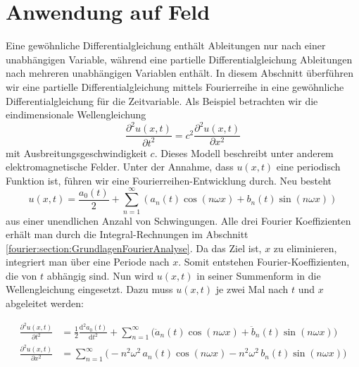 %
%
%
%



\section{Anwendung auf Feld\label{fourier:section:AnwendungAufFeld}}

Eine gewöhnliche Differentialgleichung enthält Ableitungen nur nach einer unabhängigen Variable, während eine partielle Differentialgleichung Ableitungen nach mehreren unabhängigen Variablen enthält.  
In diesem Abschnitt überführen wir eine partielle Differentialgleichung mittels Fourierreihe in eine gewöhnliche Differentialgleichung für die Zeitvariable.
Als Beispiel betrachten wir die eindimensionale Wellengleichung  
\begin{equation}\label{eq:wellengleichung}
	\frac{\partial^2 u(x,t)}{\partial t^2} = c^2 \frac{\partial^2 u(x,t)}{\partial x^2}
\end{equation}  
mit Ausbreitungsgeschwindigkeit $c$. Dieses Modell beschreibt unter anderem elektromagnetische Felder.  
Unter der Annahme, dass $u(x, t)$ eine periodisch Funktion ist, führen wir eine Fourierreihen-Entwicklung durch. 
Neu besteht 
\begin{equation}
	u(x,t) = \frac{a_0(t)}{2} + \sum_{n=1}^{\infty} \left( a_n(t) \cos(n \omega x) + b_n(t) \sin(n \omega x) \right)
\end{equation}
aus einer unendlichen Anzahl von Schwingungen.
Alle drei Fourier Koeffizienten erhält man durch die Integral-Rechnungen im Abschnitt \ref{fourier:section:GrundlagenFourierAnalyse}. 
Da das Ziel ist, $x$ zu eliminieren, integriert man über eine Periode nach $x$.
Somit entstehen Fourier-Koeffizienten, die von $t$ abhängig sind. 
Nun wird $u(x,t)$ in seiner Summenform in die Wellengleichung eingesetzt. 
Dazu muss $u(x,t)$ je zwei Mal nach $t$ und $x$ abgeleitet werden:

\begin{equation}
	\begin{aligned}
		\frac{\partial^2 u(x,t)}{\partial t^2}
		&= \frac{1}{2}\frac{\mathrm d^2 a_0(t)}{\mathrm d t^2}
		+ \sum_{n=1}^{\infty}\bigl(\ddot a_n(t)\cos(n\omega x)+\ddot b_n(t)\sin(n\omega x)\bigr)\\
		\frac{\partial^2 u(x,t)}{\partial x^2}
		&= \sum_{n=1}^{\infty}\bigl(-n^2\omega^2\,a_n(t)\cos(n\omega x)-n^2\omega^2\,b_n(t)\sin(n\omega x)\bigr)
	\end{aligned}
\end{equation}

